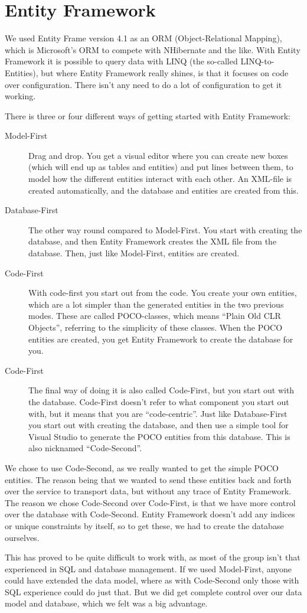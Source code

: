 \section{Entity Framework}
\label{database_entityframework}
We used Entity Frame version 4.1 as an ORM (Object-Relational Mapping), which is Microsoft's ORM to compete with NHibernate and the like. With Entity Framework it is possible to query data with LINQ (the so-called LINQ-to-Entities), but where Entity Framework really shines, is that it focuses on code over configuration. There isn't any need to do a lot of configuration to get it working.

There is three or four different ways of getting started with Entity Framework:

\begin{description}
\item[Model-First] Drag and drop. You get a visual editor where you can create new boxes (which will end up as tables and entities) and put lines between them, to model how the different entities interact with each other. An XML-file is created automatically, and the database and entities are created from this.
\item[Database-First] The other way round compared to Model-First. You start with creating the database, and then Entity Framework creates the XML file from the database. Then, just like Model-First, entities are created.
\item[Code-First] With code-first you start out from the code. You create your own entities, which are a lot simpler than the generated entities in the two previous modes. These are called POCO-classes, which means ``Plain Old CLR Objects'', referring to the simplicity of these classes. When the POCO entities are created, you get Entity Framework to create the database for you.
\item[Code-First] The final way of doing it is also called Code-First, but you start out with the database. Code-First doesn't refer to what component you start out with, but it means that you are ``code-centric''. Just like Database-First you start out with creating the database, and then use a simple tool for Visual Studio to generate the POCO entities from this database. This is also nicknamed ``Code-Second''.
\end{description}

We chose to use Code-Second, as we really wanted to get the simple POCO entities. The reason being that we wanted to send these entities back and forth over the service to transport data, but without any trace of Entity Framework. The reason we chose Code-Second over Code-First, is that we have more control over the database with Code-Second. Entity Framework doesn't add any indices or unique constraints by itself, so to get these, we had to create the database ourselves.

This has proved to be quite difficult to work with, as most of the group isn't that experienced in SQL and database management. If we used Model-First, anyone could have extended the data model, where as with Code-Second only those with SQL experience could do just that. But we did get complete control over our data model and database, which we felt was a big advantage.